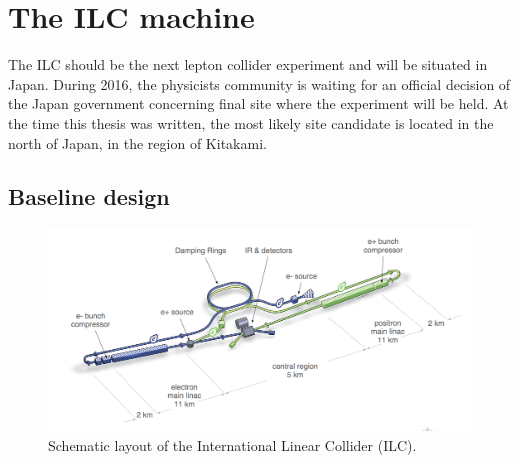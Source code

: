 
  \section{The ILC machine}
  
    The \gls{ILC} should be the next lepton collider experiment and will be situated in Japan.
    During 2016, the physicists community is waiting for an official decision of the Japan government concerning final site where the experiment will be held.
    At the time this thesis was written, the most likely site candidate is located in the north of Japan, in the region of Kitakami. 
    
    \subsection{Baseline design}

   \begin{figure}[!h]
      \centering
      \includegraphics[width = 16 cm]{Pictures/ILC/ILC_new.png}
      \caption{Schematic layout of the International Linear Collider (ILC).\cite{Behnke2013}}
      \label{fig:ILC}
    \end{figure}



